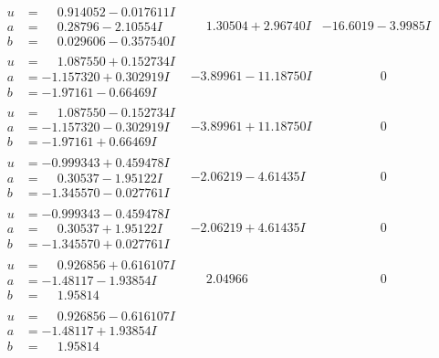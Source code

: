 \documentclass[1p]{elsarticle_modified}
\theoremstyle{definition}
\begin{document}
$$\begin{array}{c|c|c}
\begin{aligned}
u &= \phantom{-}0.914052 - 0.017611 I \\
a &= \phantom{-}0.28796 - 2.10554 I \\
b &= \phantom{-}0.029606 - 0.357540 I\end{aligned}
 & \phantom{-}1.30504 + 2.96740 I & -16.6019 - 3.9985 I \\ \hline\begin{aligned}
u &= \phantom{-}1.087550 + 0.152734 I \\
a &= -1.157320 + 0.302919 I \\
b &= -1.97161 - 0.66469 I\end{aligned}
 & -3.89961 - 11.18750 I & \phantom{-0.000000 } 0 \\ \hline\begin{aligned}
u &= \phantom{-}1.087550 - 0.152734 I \\
a &= -1.157320 - 0.302919 I \\
b &= -1.97161 + 0.66469 I\end{aligned}
 & -3.89961 + 11.18750 I & \phantom{-0.000000 } 0 \\ \hline\begin{aligned}
u &= -0.999343 + 0.459478 I \\
a &= \phantom{-}0.30537 - 1.95122 I \\
b &= -1.345570 - 0.027761 I\end{aligned}
 & -2.06219 - 4.61435 I & \phantom{-0.000000 } 0 \\ \hline\begin{aligned}
u &= -0.999343 - 0.459478 I \\
a &= \phantom{-}0.30537 + 1.95122 I \\
b &= -1.345570 + 0.027761 I\end{aligned}
 & -2.06219 + 4.61435 I & \phantom{-0.000000 } 0 \\ \hline\begin{aligned}
u &= \phantom{-}0.926856 + 0.616107 I \\
a &= -1.48117 - 1.93854 I \\
b &= \phantom{-}1.95814\phantom{ +0.000000I}\end{aligned}
 & \phantom{-}2.04966\phantom{ +0.000000I} & \phantom{-0.000000 } 0 \\ \hline\begin{aligned}
u &= \phantom{-}0.926856 - 0.616107 I \\
a &= -1.48117 + 1.93854 I \\
b &= \phantom{-}1.95814\phantom{ +0.000000I}\end{aligned}

\end{array}$$
\end{document}

